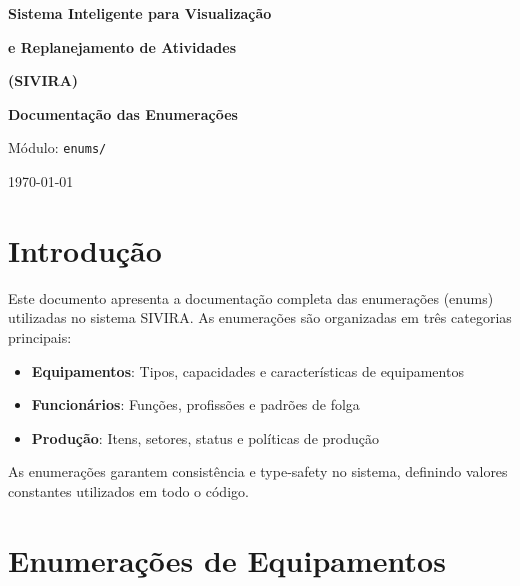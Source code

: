 \documentclass[11pt,a4paper]{article}
\begin{document}
\begin{titlepage}
    \centering
    \vspace*{3cm}

    {\Huge\bfseries Sistema Inteligente para Visualização\par}
    {\Huge\bfseries e Replanejamento de Atividades\par}
    \vspace{0.5cm}
    {\Large\bfseries (SIVIRA)\par}

    \vspace{2cm}
    {\LARGE\bfseries Documentação das Enumerações\par}

    \vspace{2cm}
    {\large Módulo: \texttt{enums/}\par}

    \vfill

    {\large \today\par}
\end{titlepage}

\tableofcontents
\newpage

\section{Introdução}

Este documento apresenta a documentação completa das enumerações (enums) utilizadas no sistema SIVIRA. As enumerações são organizadas em três categorias principais:

\begin{itemize}
    \item \textbf{Equipamentos}: Tipos, capacidades e características de equipamentos
    \item \textbf{Funcionários}: Funções, profissões e padrões de folga
    \item \textbf{Produção}: Itens, setores, status e políticas de produção
\end{itemize}

As enumerações garantem consistência e type-safety no sistema, definindo valores constantes utilizados em todo o código.

\newpage

\section{Enumerações de Equipamentos}
\end{document}
